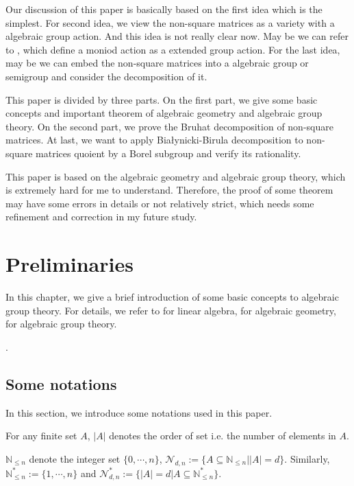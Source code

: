 \documentclass[10pt,UTF8]{article}
\theoremstyle{definition}
\begin{document}
Our discussion of this paper is basically based on the first idea which is the simplest. 
For second idea, we view the non-square matrices as a variety with a algebraic group action. And this idea
is not really clear now. May be we can refer to \cite{jelisiejew2019bialynicki}, which define a moniod action as 
a extended group action.
For the last idea, may be we can embed the non-square matrices into a algebraic group or semigroup and consider the decomposition of it.

This paper is divided by three parts. On the first part, we give some basic concepts and important theorem of algebraic geometry and algebraic group theory.
On the second part, we prove the Bruhat decomposition of non-square matrices.
At last, we want to apply Białynicki-Birula decomposition to non-square matrices quoient by a Borel subgroup and verify its rationality.

This paper is based on the algebraic geometry and algebraic group theory, which is extremely hard for me to understand.
Therefore, the proof of some theorem may have some errors in details or not relatively strict, which 
needs some refinement and correction in my future study.




\newpage

\section{Preliminaries}

In this chapter, we give a brief introduction of some basic concepts to algebraic group theory.
For details, we refer to \cite{roman2005advanced,axler1997linear} for linear algebra,\cite{hartshorne2013algebraic,bosch2022algebraic,harris2013algebraic} for algebraic geometry,
\cite{milne2017algebraic,springer1994linear,geck2013introduction} for algebraic group theory.



.


\subsection{Some notations}
In this section, we introduce some notations used in this paper.

For any finite set $A$, $|A|$ denotes the order of set i.e. the number of elements in $A$.

$\mathbb{N}_{\le n}$ denote the integer set $\{0,\cdots,n\}$, $\mathcal{N}_{d,n} := \{A\subseteq \mathbb{N}_{\le n}||A| = d\}$.
Similarly, $\mathbb{N}^*_{\le n} := \{1,\cdots,n\}$ and $\mathcal{N}^*_{d,n} := \{|A| = d|A\subseteq \mathbb{N}^*_{\le n}\}$.
\end{document}
